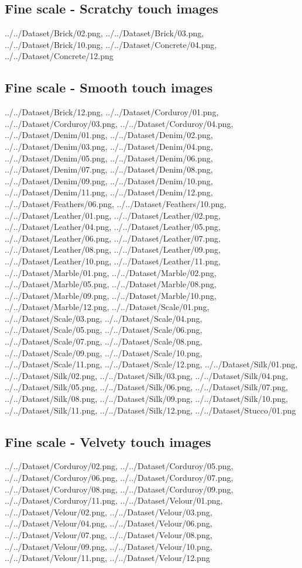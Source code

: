 \newpage
\subsection{Fine scale - Scratchy touch images}
{../../Dataset/Brick/02.png,
../../Dataset/Brick/03.png,
../../Dataset/Brick/10.png,
../../Dataset/Concrete/04.png,
../../Dataset/Concrete/12.png}

\newpage
\newpage
\subsection{Fine scale - Smooth touch images}
{../../Dataset/Brick/12.png,
../../Dataset/Corduroy/01.png,
../../Dataset/Corduroy/03.png,
../../Dataset/Corduroy/04.png,
../../Dataset/Denim/01.png,
../../Dataset/Denim/02.png,
../../Dataset/Denim/03.png,
../../Dataset/Denim/04.png,
../../Dataset/Denim/05.png,
../../Dataset/Denim/06.png,
../../Dataset/Denim/07.png,
../../Dataset/Denim/08.png,
../../Dataset/Denim/09.png,
../../Dataset/Denim/10.png,
../../Dataset/Denim/11.png,
../../Dataset/Denim/12.png,
../../Dataset/Feathers/06.png,
../../Dataset/Feathers/10.png,
../../Dataset/Leather/01.png,
../../Dataset/Leather/02.png,
../../Dataset/Leather/04.png,
../../Dataset/Leather/05.png,
../../Dataset/Leather/06.png,
../../Dataset/Leather/07.png,
../../Dataset/Leather/08.png,
../../Dataset/Leather/09.png,
../../Dataset/Leather/10.png,
../../Dataset/Leather/11.png,
../../Dataset/Marble/01.png,
../../Dataset/Marble/02.png,
../../Dataset/Marble/05.png,
../../Dataset/Marble/08.png,
../../Dataset/Marble/09.png,
../../Dataset/Marble/10.png,
../../Dataset/Marble/12.png,
../../Dataset/Scale/01.png,
../../Dataset/Scale/03.png,
../../Dataset/Scale/04.png,
../../Dataset/Scale/05.png,
../../Dataset/Scale/06.png,
../../Dataset/Scale/07.png,
../../Dataset/Scale/08.png,
../../Dataset/Scale/09.png,
../../Dataset/Scale/10.png,
../../Dataset/Scale/11.png,
../../Dataset/Scale/12.png,
../../Dataset/Silk/01.png,
../../Dataset/Silk/02.png,
../../Dataset/Silk/03.png,
../../Dataset/Silk/04.png,
../../Dataset/Silk/05.png,
../../Dataset/Silk/06.png,
../../Dataset/Silk/07.png,
../../Dataset/Silk/08.png,
../../Dataset/Silk/09.png,
../../Dataset/Silk/10.png,
../../Dataset/Silk/11.png,
../../Dataset/Silk/12.png,
../../Dataset/Stucco/01.png}

\newpage
\subsection{Fine scale - Velvety touch images}
{../../Dataset/Corduroy/02.png,
../../Dataset/Corduroy/05.png,
../../Dataset/Corduroy/06.png,
../../Dataset/Corduroy/07.png,
../../Dataset/Corduroy/08.png,
../../Dataset/Corduroy/09.png,
../../Dataset/Corduroy/11.png,
../../Dataset/Velour/01.png,
../../Dataset/Velour/02.png,
../../Dataset/Velour/03.png,
../../Dataset/Velour/04.png,
../../Dataset/Velour/06.png,
../../Dataset/Velour/07.png,
../../Dataset/Velour/08.png,
../../Dataset/Velour/09.png,
../../Dataset/Velour/10.png,
../../Dataset/Velour/11.png,
../../Dataset/Velour/12.png}

